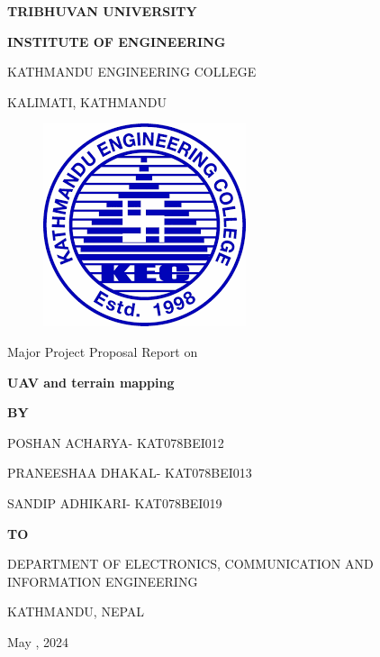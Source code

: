 \begin{titlepage}
    \thispagestyle{empty}
    \begin{center}
    
    \vspace*{\fill} %
    \vspace*{-1cm}
    {\Large \textbf{TRIBHUVAN UNIVERSITY
}\par}
{\large \textbf{INSTITUTE OF ENGINEERING
}\par}
\vspace{12pt}
KATHMANDU ENGINEERING COLLEGE

KALIMATI, KATHMANDU
\vspace{24pt}

\begin{figure}[ht]
    \centering
    \includegraphics[scale=0.45]{images/kec.png}
\end{figure}
\vspace{24pt}
{Major Project Proposal Report on\par}
\vspace{6pt}
{\textbf{ UAV and terrain mapping}\par}

\vspace{18pt}
{\textbf{BY}\par}
\vspace{10pt}
    
{POSHAN ACHARYA- KAT078BEI012\par}
{PRANEESHAA DHAKAL- KAT078BEI013\par}
{SANDIP ADHIKARI- KAT078BEI019\par}

\vspace{28pt}
{\textbf{TO}\par}
\vspace{10pt}
{DEPARTMENT OF ELECTRONICS, COMMUNICATION AND INFORMATION ENGINEERING\par}
{KATHMANDU, NEPAL\par}
\vspace{14pt}
{May , 2024\par}

    \vspace*{\fill}

    \end{center}
\end{titlepage}